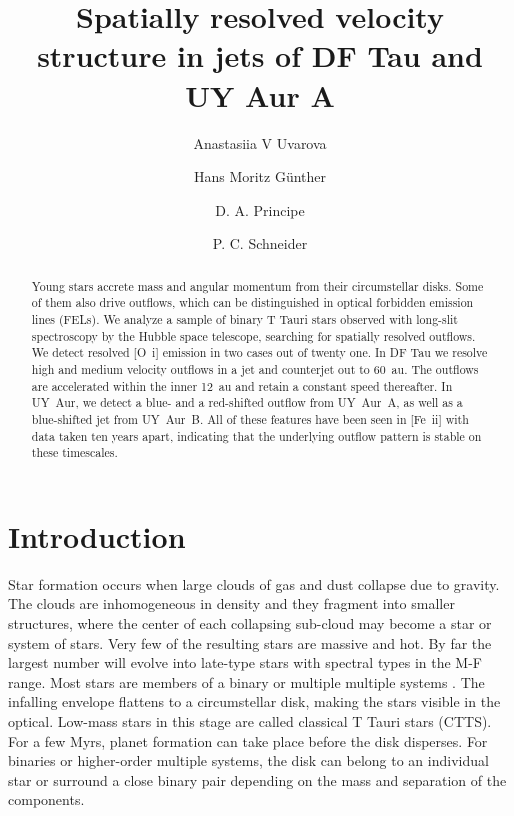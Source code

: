 \documentclass[twocolumn]{aastex62}
\begin{document}
\title{Spatially resolved velocity structure in jets of DF Tau and UY Aur A}



\author{Anastasiia V Uvarova}

\author[0000-0003-4243-2840]{Hans Moritz G\"unther}

\author{D. A. Principe}

\author{P. C. Schneider}

\begin{abstract}
Young stars accrete mass and angular momentum from their circumstellar
disks. Some of them also drive outflows, which can be distinguished in
optical forbidden emission lines (FELs). We analyze a sample of binary
T Tauri stars observed with long-slit spectroscopy by the Hubble space
telescope, searching for spatially resolved outflows. We detect resolved [O~{\sc i}] emission in two cases out of twenty one. In DF Tau we resolve high and medium velocity outflows in a jet and counterjet out to 60~au. The outflows are accelerated within the inner 12~au and retain a constant speed thereafter. In UY~Aur, we detect a blue- and a red-shifted outflow from UY~Aur~A, as well as a blue-shifted jet from UY~Aur~B. All of these features have been seen in [Fe~{\sc ii}] with data taken ten years apart, indicating that the underlying outflow pattern is stable on these timescales.
\end{abstract}%


\section{Introduction}

Star formation occurs when large clouds of gas and dust collapse due to
gravity. The clouds are inhomogeneous in density and they fragment into
smaller structures, where the center of each collapsing sub-cloud may
become a star or system of stars. Very few of the resulting stars are
massive and hot. By far the largest number will evolve into late-type
stars with spectral types in the M-F range. Most stars are members of a binary or multiple multiple systems \citep[see e.g.\ review by][]{2007prpl.conf..379D}.
The infalling envelope
flattens to a circumstellar disk, making the stars visible in the
optical. Low-mass stars in this stage are called classical T Tauri stars
(CTTS). For a few Myrs, planet formation can take place before the disk
disperses. For binaries or higher-order multiple systems, the disk can
belong to an individual star or surround a close binary pair depending
on the mass and separation of the components.
\end{document}
